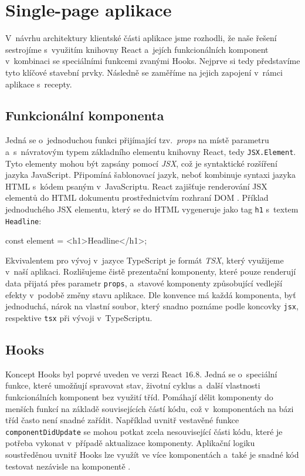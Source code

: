 \section{Single-page aplikace}

V~návrhu architektury klientské části aplikace jsme rozhodli, že naše řešení sestrojíme s~využitím knihovny React a~jejích funkcionálních komponent v~kombinaci se speciálními funkcemi zvanými Hooks. Nejprve si tedy představíme tyto klíčové stavební prvky. Následně se zaměříme na jejich zapojení v~rámci aplikace s~recepty.

\subsection{Funkcionální komponenta}

Jedná se o~jednoduchou funkci přijímající tzv.~\emph{props} na místě parametru a~s~návratovým typem základního elementu knihovny React, tedy \texttt{JSX.Element}. Tyto elementy mohou být zapsány pomocí \emph{JSX}, což je syntaktické rozšíření jazyka JavaScript. Připomíná šablonovací jazyk, neboť kombinuje syntaxi jazyka HTML s~kódem psaným v~JavaScriptu. React zajišťuje renderování JSX elementů do HTML dokumentu prostřednictvím rozhraní DOM \citep{jsx-intro}. Příklad jednoduchého JSX elementu, který se do HTML vygeneruje jako tag \texttt{h1} s~textem \texttt{Headline}:

\begin{code}
const element = <h1>Headline</h1>;
\end{code}

Ekvivalentem pro vývoj v~jazyce TypeScript je formát \emph{TSX}, který využijeme v~naší aplikaci. Rozlišujeme čistě prezentační komponenty, které pouze renderují data přijatá přes parametr \texttt{props}, a~stavové komponenty způsobující vedlejší efekty v~podobě změny stavu aplikace. Dle konvence má každá komponenta, byť jednoduchá, nárok na vlastní soubor, který snadno poznáme podle koncovky \texttt{jsx}, respektive \texttt{tsx} při vývoji v~TypeScriptu.

\subsection{Hooks}

Koncept Hooks byl poprvé uveden ve verzi React $16.8$. Jedná se o~speciální funkce, které umožňují spravovat stav, životní cyklus a~další vlastnosti funkcionálních komponent bez využití tříd. Pomáhají dělit komponenty do menších funkcí na základě souvisejících částí kódu, což v~komponentách na bázi tříd často není snadné zařídit. Například uvnitř vestavěné funkce \texttt{componentDidUpdate} se mohou potkat zcela nesouvisející části kódu, které je potřeba vykonat v~případě aktualizace komponenty. Aplikační logiku soustředěnou uvnitř Hooks lze využít ve více komponentách a~také je snadné kód testovat nezávisle na komponentě \citep{react-hooks}.

